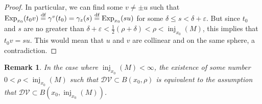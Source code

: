 \documentclass[11pt,twoside]{amsart}
\theoremstyle{plain}
\newtheorem{rem}[prop]{Remark}
\DeclareMathOperator{\Exp}{\mathrm{Exp}}
\DeclareMathOperator\inj{inj}
\begin{document}
\begin{proof}
In particular, we can find some $v\ne\pm u$ such that $\mathrm{Exp}_{x_0}(t_0v)\stackrel{\tiny{\text{df}}}=\gamma^v(t_0)=\gamma_z(s)\stackrel{\tiny{\text{df}}}=\Exp_{x_0}(su)$ for some $\delta\le s<\delta+\varepsilon$. But since $t_0$ and $s$ are no greater than $\delta+\varepsilon<\tfrac{1}{2}(\rho+\delta)<\rho<\inj_{x_0}\!(M)$, this implies that $t_0v=su$. This would mean that $u$ and $v$ are collinear and on the same sphere, a contradiction.
\end{proof}

\begin{rem}
In the case where $\inj_{x_0}\!(M)<\infty$, the existence of some number $0<\rho<\inj_{x_0}\!(M)$ such that $\mathcal{DV}\subset B(x_0,\rho)$ is equivalent to the assumption that $\mathcal{DV}\subset B(x_0,\inj_{x_0}\!(M))$.
\end{rem}



\end{document}
